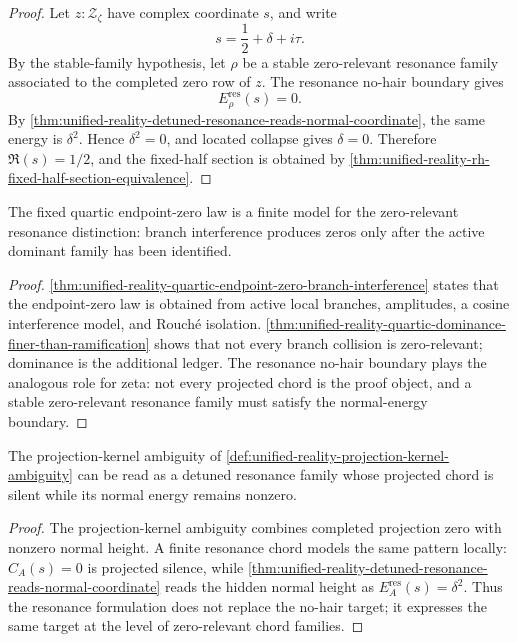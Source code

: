 \begin{proof}
Let $z:\mathcal Z_{\zeta}$ have complex coordinate $s$, and write
$$
s=\frac12+\delta+i\tau.
$$
By the stable-family hypothesis, let $\rho$ be a stable zero-relevant
resonance family associated to the completed zero row of $z$.  The
resonance no-hair boundary gives
$$
E_{\rho}^{\mathrm{res}}(s)=0.
$$
By
\autoref{thm:unified-reality-detuned-resonance-reads-normal-coordinate},
the same energy is $\delta^2$.  Hence $\delta^2=0$, and located collapse
gives $\delta=0$.  Therefore $\Re(s)=1/2$, and the fixed-half section is
obtained by
\autoref{thm:unified-reality-rh-fixed-half-section-equivalence}.
\end{proof}

\begin{corollary}
\label{cor:unified-reality-quartic-endpoint-zeros-finite-resonance-guidance}
The fixed quartic endpoint-zero law is a finite model for the
zero-relevant resonance distinction: branch interference produces zeros
only after the active dominant family has been identified.
\end{corollary}

\begin{proof}
\autoref{thm:unified-reality-quartic-endpoint-zero-branch-interference}
states that the endpoint-zero law is obtained from active local branches,
amplitudes, a cosine interference model, and Rouch\'e isolation.
\autoref{thm:unified-reality-quartic-dominance-finer-than-ramification}
shows that not every branch collision is zero-relevant; dominance is the
additional ledger.  The resonance no-hair boundary plays the analogous
role for zeta: not every projected chord is the proof object, and a
stable zero-relevant resonance family must satisfy the normal-energy
boundary.
\end{proof}

\begin{corollary}
\label{cor:unified-reality-resonance-refines-projection-kernel-gap}
The projection-kernel ambiguity of
\autoref{def:unified-reality-projection-kernel-ambiguity} can be read as
a detuned resonance family whose projected chord is silent while its
normal energy remains nonzero.
\end{corollary}

\begin{proof}
The projection-kernel ambiguity combines completed projection zero with
nonzero normal height.  A finite resonance chord models the same pattern
locally: $C_A(s)=0$ is projected silence, while
\autoref{thm:unified-reality-detuned-resonance-reads-normal-coordinate}
reads the hidden normal height as $E_A^{\mathrm{res}}(s)=\delta^2$.
Thus the resonance formulation does not replace the no-hair target; it
expresses the same target at the level of zero-relevant chord families.
\end{proof}
